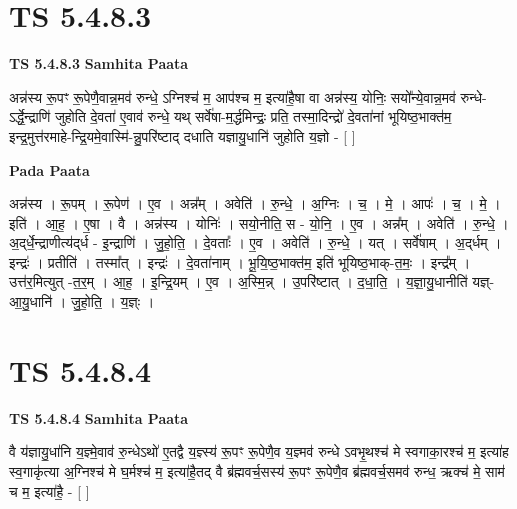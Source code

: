 \documentclass[17pt]{extarticle}
\begin{document}

\section{ TS 5.4.8.3 }

\textbf{TS 5.4.8.3 } \newline
\textbf{Samhita Paata} \newline

अन्न॑स्य रू॒पꣳ रू॒पेणै॒वान्न॒मव॑ रुन्धे॒ ऽग्निश्च॑ म॒ आप॑श्च म॒ इत्या॑है॒षा वा अन्न॑स्य॒ योनिः॒ सयो᳚न्ये॒वान्न॒मव॑ रुन्धे-ऽर्द्धे॒न्द्राणि॑ जुहोति दे॒वता॑ ए॒वाव॑ रुन्धे॒ यथ् सर्वे॑षा-म॒र्द्धमिन्द्रः॒ प्रति॒ तस्मा॒दिन्द्रो॑ दे॒वता॑नां भूयिष्ठ॒भाक्त॑म॒ इन्द्र॒मुत्त॑रमाहे-न्द्रि॒यमे॒वास्मि॑-न्नु॒परि॑ष्टाद् दधाति यज्ञायु॒धानि॑ जुहोति य॒ज्ञो - [  ] \newline

\textbf{Pada Paata} \newline

अन्न॑स्य । रू॒पम् । रू॒पेण॑ । ए॒व । अन्न᳚म् । अवेति॑ । रु॒न्धे॒ । अ॒ग्निः । च॒ । मे॒ । आपः॑ । च॒ । मे॒ । इति॑ । आ॒ह॒ । ए॒षा । वै । अन्न॑स्य । योनिः॑ । सयो॒नीति॒ स - यो॒नि॒ । ए॒व । अन्न᳚म् । अवेति॑ । रु॒न्धे॒ । अ॒द्‌र्धे॒न्द्राणीत्य॑द्‌र्ध - इ॒न्द्राणि॑ । जु॒हो॒ति॒ । दे॒वताः᳚ । ए॒व । अवेति॑ । रु॒न्धे॒ । यत् । सर्वे॑षाम् । अ॒द्‌र्धम् । इन्द्रः॑ । प्रतीति॑ । तस्मा᳚त् । इन्द्रः॑ । दे॒वता॑नाम् । भू॒यि॒ष्ठ॒भाक्त॑म॒ इति॑ भूयिष्ठ॒भाक्-त॒मः॒ । इन्द्र᳚म् । उत्त॑र॒मित्युत् -त॒र॒म् । आ॒ह॒ । इ॒न्द्रि॒यम् । ए॒व । अ॒स्मि॒न्न् । उ॒परि॑ष्टात् । द॒धा॒ति॒ । य॒ज्ञा॒यु॒धानीति॑ यज्ञ्-आ॒यु॒धानि॑ । जु॒हो॒ति॒ । य॒ज्ञ्ः ।  \newline





\section{ TS 5.4.8.4 }

\textbf{TS 5.4.8.4 } \newline
\textbf{Samhita Paata} \newline

वै य॑ज्ञायु॒धा॑नि य॒ज्ञ्मे॒वाव॑ रु॒न्धेऽथो॑ ए॒तद्वै य॒ज्ञ्स्य॑ रू॒पꣳ रू॒पेणै॒व य॒ज्ञ्मव॑ रुन्धे ऽवभृ॒थश्च॑ मे स्वगाका॒रश्च॑ म॒ इत्या॑ह स्व॒गाकृ॑त्या अ॒ग्निश्च॑ मे घ॒र्मश्च॑ म॒ इत्या॑है॒तद् वै ब्र॑ह्मवर्च॒सस्य॑ रू॒पꣳ रू॒पेणै॒व ब्र॑ह्मवर्च॒समव॑ रुन्ध॒ ऋक्च॑ मे॒ साम॑ च म॒ इत्या॑है॒ - [  ] \newline
\end{document}

